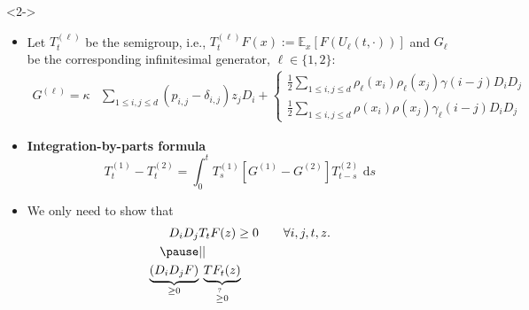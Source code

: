 \documentclass[9pt,table,xcolor=dvipsnames]{beamer}%
\newcommand{\E}{\mathbb{E}}
\newcommand{\ud}{\ensuremath{\mathrm{d} }}
\theoremstyle{definition}
\theoremstyle{plain}
\begin{document}
\begin{frame}<2->
\begin{itemize}
  \vfill
  \item[] Let $T_t^{(\ell)}$ be the semigroup, i.e., $T_t^{(\ell)} F(x):=\E_{x}\left[ F\left(U_\ell(t,\cdot)\right)\right]$ and $G_\ell$ be the corresponding infinitesimal generator, $\ell\in \{1,2\}$:
  \begin{align*}
    G^{(\ell)} = \kappa &\sum_{1\leq i, j \leq d} \left(p_{i,j}-\delta_{i,j}\right) z_j D_i +
    \begin{cases}
      \displaystyle \frac{1}{2}\sum_{1\leq i, j \leq d} \rho_\ell(x_i)\rho_\ell(x_j) \gamma(i-j) D_iD_j\\[1em]
      \displaystyle \frac{1}{2}\sum_{1\leq i, j \leq d} \rho(x_i)\rho(x_j) \gamma_\ell(i-j) D_iD_j
    \end{cases}
  \end{align*}
  \vfill
  \item \textcolor{yellow!75!black}{\bf Integration-by-parts formula}
    \[
      T_t^{(1)} - T_t^{(2)} = \int_0^t T_s^{(1)}\left[ G^{(1)} - G^{(2)} \right] T^{(2)}_{t-s} \,\, \ud s
    \]
    \vfill
  \item We only need to show that
    \begin{align*}
      D_iD_j & T_t F(z) \geq 0 \qquad \forall i, j, t, z.\\ \pause
             &||\\
      \underbrace{\left( D_iD_j F \right)}_{\ge 0} &\: \underbrace{TF_t(z)}_{\stackrel{?}{\ge} 0}
    \end{align*}
\end{itemize}
\end{frame}
\end{document}
